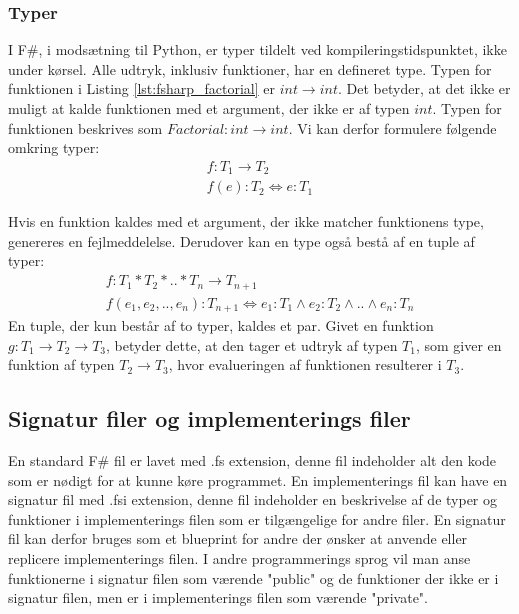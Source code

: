 \subsubsection{Typer}
I F\#, i modsætning til Python, er typer tildelt ved kompileringstidspunktet, ikke under kørsel. Alle udtryk, inklusiv funktioner, har en defineret type. Typen for funktionen i Listing \textcolor{red}{\ref{lst:fsharp_factorial}} er $int \rightarrow int$. Det betyder, at det ikke er muligt at kalde funktionen med et argument, der ikke er af typen $int$. Typen for funktionen beskrives som $Factorial: int \rightarrow int$. Vi kan derfor formulere følgende omkring typer:
\begin{gather*}
    f: T_1 \rightarrow T_2 \\
    f(e) : T_2 \iff e : T_1
\end{gather*}

Hvis en funktion kaldes med et argument, der ikke matcher funktionens type, genereres en fejlmeddelelse. Derudover kan en type også bestå af en tuple af typer:
\begin{gather*}
    f: T_1 * T_2 * .. * T_n \rightarrow T_{n+1}\\
    f (e_1, e_2, .., e_n) :T_{n+1} \iff e_1 : T_1 \land e_2 : T_2 \land .. \land e_n : T_n
\end{gather*}
En tuple, der kun består af to typer, kaldes et par. Givet en funktion $g: T_1 \rightarrow T_2 \rightarrow T_3$, betyder dette, at den tager et udtryk af typen $T_1$, som giver en funktion af typen $T_2 \rightarrow T_3$, hvor evalueringen af funktionen resulterer i $T_3$.




\subsection{Signatur filer og implementerings filer}
En standard F\# fil er lavet med .fs extension, denne fil indeholder alt den kode som er nødigt for at kunne køre programmet. En implementerings fil kan have en signatur fil med .fsi extension, denne fil indeholder en beskrivelse af de typer og funktioner i implementerings filen som er tilgængelige for andre filer. En signatur fil kan derfor bruges som et blueprint for andre der ønsker at anvende eller replicere implementerings filen. I andre programmerings sprog vil man anse funktionerne i signatur filen som værende "public" og de funktioner der ikke er i signatur filen, men er i implementerings filen som værende "private". 

